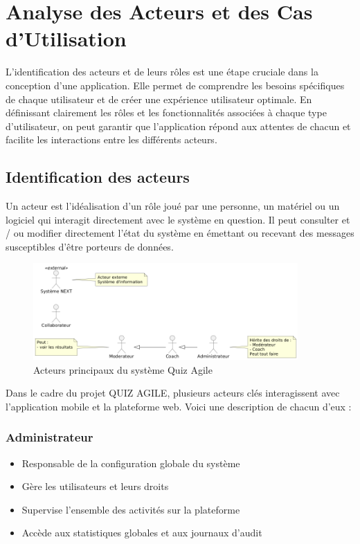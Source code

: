 \documentclass[12pt,a4paper]{report}
\begin{document}
\section{Analyse des Acteurs et des Cas d'Utilisation}

L'identification des acteurs et de leurs rôles est une étape cruciale dans la conception d'une application. Elle permet de comprendre les besoins spécifiques de chaque utilisateur et de créer une expérience utilisateur optimale. En définissant clairement les rôles et les fonctionnalités associées à chaque type d'utilisateur, on peut garantir que l'application répond aux attentes de chacun et facilite les interactions entre les différents acteurs.

\subsection{Identification des acteurs}

Un acteur est l'idéalisation d'un rôle joué par une personne, un matériel ou un logiciel qui interagit directement avec le système en question. Il peut consulter et / ou modifier directement l'état du système en émettant ou recevant des messages susceptibles d'être porteurs de données.

\begin{figure}[H]
\centering
\includegraphics[width=0.9\textwidth]{latex_media/media/image13.png}
\caption{Acteurs principaux du système Quiz Agile}
\label{fig:acteurs-principaux}
\end{figure}

Dans le cadre du projet QUIZ AGILE, plusieurs acteurs clés interagissent avec l'application mobile et la plateforme web. Voici une description de chacun d'eux :

\subsubsection{Administrateur}

\begin{itemize}
\item Responsable de la configuration globale du système
\item Gère les utilisateurs et leurs droits
\item Supervise l'ensemble des activités sur la plateforme
\item Accède aux statistiques globales et aux journaux d'audit
\end{itemize}
\end{document}
